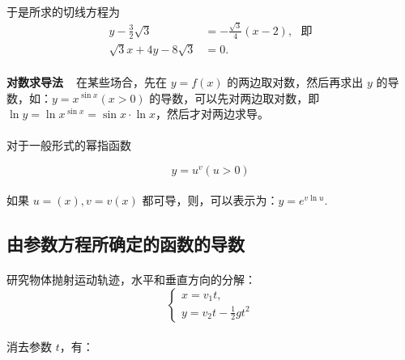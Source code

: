 \paragraph{}
于是所求的切线方程为
\begin{align*}
y - \frac{3}{2}\sqrt{3} &= -\frac{\sqrt{3}}{4}(x - 2), \text{~~即}\\
\sqrt{3}x + 4y - 8\sqrt{3} &= 0.
\end{align*}

\paragraph{}
\textbf{对数求导法~~}在某些场合，先在 $y = f(x)$ 的两边取对数，然后再求出 $y$ 的导数，如：$y = x^{\sin x} (x > 0)$ 的导数，可以先对两边取对数，即 $\ln y = \ln x^{\sin x} = \sin x \cdot \ln x$，然后才对两边求导。

\paragraph{}
对于一般形式的幂指函数

\begin{equation}
y = u^v (u > 0)
\end{equation}

\paragraph{}
如果 $u = (x), v = v(x)$ 都可导，则，可以表示为：$y = e^{v \ln u}.$

\subsection{由参数方程所确定的函数的导数}
\paragraph{}
研究物体抛射运动轨迹，水平和垂直方向的分解：
\begin{equation}
\left\{
  \begin{array}{l}
    x = v_1 t, \\
    y = v_2 t - \frac{1}{2}gt^2
  \end{array}
\right.
\end{equation}

\paragraph{}
消去参数 $t$，有：

